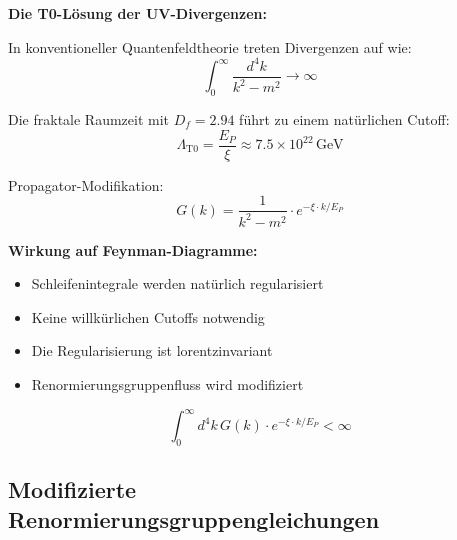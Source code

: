 \documentclass[12pt,a4paper]{article}
\newcommand{\xipar}{\xi}
\begin{document}
	\begin{anwendung}
		\textbf{Die T0-Lösung der UV-Divergenzen:}
		
		In konventioneller Quantenfeldtheorie treten Divergenzen auf wie:
		\begin{equation}
			\int_0^\infty \frac{d^4k}{k^2 - m^2} \to \infty
		\end{equation}
		
		Die fraktale Raumzeit mit $D_f = 2.94$ führt zu einem natürlichen Cutoff:
		\begin{equation}
			\boxed{\Lambda_{\text{T0}} = \frac{E_P}{\xipar} \approx 7.5 \times 10^{22}\, \text{GeV}}
		\end{equation}
		
		Propagator-Modifikation:
		\begin{equation}
			G(k) = \frac{1}{k^2 - m^2} \cdot e^{-\xipar \cdot k/E_P}
		\end{equation}
		
		\textbf{Wirkung auf Feynman-Diagramme:}
		\begin{itemize}
			\item Schleifenintegrale werden natürlich regularisiert
			\item Keine willkürlichen Cutoffs notwendig
			\item Die Regularisierung ist lorentzinvariant
			\item Renormierungsgruppenfluss wird modifiziert
		\end{itemize}
		
		\begin{equation}
			\int_0^\infty d^4k\, G(k) \cdot e^{-\xipar \cdot k/E_P} < \infty
		\end{equation}
	\end{anwendung}
	
	\subsection{Modifizierte Renormierungsgruppengleichungen}
	
\end{document}
